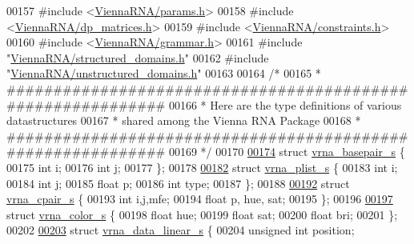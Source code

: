 \begin{DoxyCode}
00157 \textcolor{preprocessor}{#include <\hyperlink{params_8h}{ViennaRNA/params.h}>}
00158 \textcolor{preprocessor}{#include <\hyperlink{dp__matrices_8h}{ViennaRNA/dp\_matrices.h}>}
00159 \textcolor{preprocessor}{#include <\hyperlink{constraints_8h}{ViennaRNA/constraints.h}>}
00160 \textcolor{preprocessor}{#include <\hyperlink{grammar_8h}{ViennaRNA/grammar.h}>}
00161 \textcolor{preprocessor}{#include "\hyperlink{structured__domains_8h}{ViennaRNA/structured\_domains.h}"}
00162 \textcolor{preprocessor}{#include "\hyperlink{unstructured__domains_8h}{ViennaRNA/unstructured\_domains.h}"}
00163 
00164 \textcolor{comment}{/*}
00165 \textcolor{comment}{* ############################################################}
00166 \textcolor{comment}{* Here are the type definitions of various datastructures}
00167 \textcolor{comment}{* shared among the Vienna RNA Package}
00168 \textcolor{comment}{* ############################################################}
00169 \textcolor{comment}{*/}
00170 
\hypertarget{data__structures_8h_source.tex_l00174}{}\hyperlink{group__data__structures}{00174} \textcolor{keyword}{struct }\hyperlink{group__data__structures_structvrna__basepair__s}{vrna\_basepair\_s} \{
00175   \textcolor{keywordtype}{int} i;
00176   \textcolor{keywordtype}{int} j;
00177 \};
00178 
\hypertarget{data__structures_8h_source.tex_l00182}{}\hyperlink{group__data__structures}{00182} \textcolor{keyword}{struct }\hyperlink{group__data__structures_structvrna__plist__s}{vrna\_plist\_s} \{
00183   \textcolor{keywordtype}{int} i;
00184   \textcolor{keywordtype}{int} j;
00185   \textcolor{keywordtype}{float} p;
00186   \textcolor{keywordtype}{int} type;
00187 \};
00188 
\hypertarget{data__structures_8h_source.tex_l00192}{}\hyperlink{group__data__structures}{00192} \textcolor{keyword}{struct }\hyperlink{group__data__structures_structvrna__cpair__s}{vrna\_cpair\_s} \{
00193   \textcolor{keywordtype}{int} i,j,mfe;
00194   \textcolor{keywordtype}{float} p, hue, sat;
00195 \};
00196 
\hypertarget{data__structures_8h_source.tex_l00197}{}\hyperlink{group__data__structures}{00197} \textcolor{keyword}{struct }\hyperlink{group__data__structures_structvrna__color__s}{vrna\_color\_s} \{
00198   \textcolor{keywordtype}{float} hue;
00199   \textcolor{keywordtype}{float} sat;
00200   \textcolor{keywordtype}{float} bri;
00201 \};
00202 
\hypertarget{data__structures_8h_source.tex_l00203}{}\hyperlink{group__data__structures}{00203} \textcolor{keyword}{struct }\hyperlink{group__data__structures_structvrna__data__linear__s}{vrna\_data\_linear\_s} \{
00204   \textcolor{keywordtype}{unsigned} \textcolor{keywordtype}{int}  position;

\end{DoxyCode}
